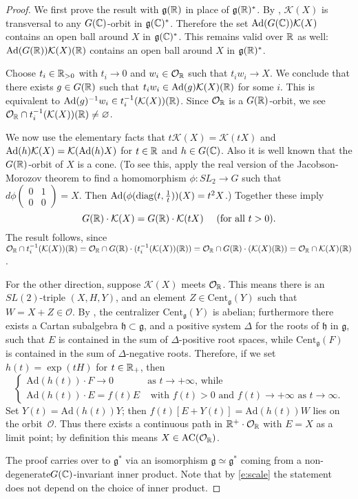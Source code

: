 \documentclass{article}
\theoremstyle{definition}
\numberwithin{equation}{section}
\renewcommand{\-}{\hyp{}}
\newcommand{\g}{\mathfrak g}
\renewcommand{\O}{\mathcal O}
\newcommand{\K}{\mathcal K}
\newcommand{\Cent}{\mathrm{Cent}}
\newcommand{\AC}{\mathrm{AC}}
\begin{document}
\begin{proof}
We first prove the result with $\g(\R)$  in place of $\g(\R)^*$.
By \cite{Kos63}, $\K(X)$ is transversal to any $G(\mathbb{C})$-orbit in $\g(\C)^*$. Therefore the set $\tx{Ad}(G(\C))\K(X)$ contains an open ball around $X$ in $\g(\C)^*$.
This remains valid over $\mathbb{R}$ as well: $\tx{Ad}(G(\R))\K(X)(\R)$ contains an open ball around $X$ in $\g(\R)^*$.

Choose $t_i \in \mathbb{R}_{>0}$ with $t_i \to 0$ and $w_i \in \O_\R$ such that $t_iw_i \to X$. We conclude that there exists $g \in G(\mathbb{R})$ such that $t_iw_i \in \tx{Ad}(g)\K(X)(\R)$ for some $i$. This is equivalent to $\tx{Ad}(g)^{-1}w_i \in t_i^{-1}(\K(X))(\R)$. Since $\O_\R$ is a $G(\mathbb{R})$-orbit, we see $\O_\R \cap t_i^{-1}(\K(X))(\R) \neq \varnothing$. 

We now use the elementary facts that $t\K(X)=\K(tX)$ and $\tx{Ad}(h)\K(X)=\K(\tx{Ad}(h)X)$ for $t \in \mathbb{R}$ and $h \in G(\mathbb{C})$.
Also it is well known that the $G(\mathbb{R})$-orbit of $X$ is a cone. (To see this, apply the real version of the Jacobson-Morozov theorem
\cite[Theorem 9.2.1]{CM} to  find a homomorphism $\phi:SL_2\rightarrow G$ such that $d\phi\begin{pmatrix}0&1\\0&0\end{pmatrix}=X$.
Then $\textrm{Ad}(\phi(\mathrm{diag}(t,\frac 1t))(X)=t^2X$.)
Together these imply
\begin{equation}
\label{e:scale}
G(\R)\cdot \K(X)=G(\R)\cdot \K(tX) \quad \text{ (for all $t>0$).}
\end{equation}
The result follows, since
$\O_\R \cap t_i^{-1}(\K(X))(\R)=\O_\R \cap G(\R)\cdot(t_i^{-1}(\K(X))(\R))=
\O_\R \cap G(\R)\cdot(\K(X)(\R))=\O_\R\cap \K(X)(\R)$.

For the other direction, suppose $\K(X)$ meets $\mathcal O_{\mathbb{R}}$.
This means there is an $SL(2)$-triple $(X,H,Y)$, and an element $Z\in \Cent_\g(Y)$ such that $W=X+Z \in \O$. 
By \cite{Kostant59}, the centralizer  $\mathrm{Cent}_{\g}(Y)$ is abelian; furthermore there exists a Cartan subalgebra $\mathfrak{h} \subset \g$, and a positive system $\Delta$ for the roots of $\mathfrak{h}$ in $\g$, such that $E$ is contained in the sum of $\Delta$-positive root spaces, while $\mathrm{Cent}_{\g}(F)$ is contained in the sum of $\Delta$-negative roots.  Therefore, if we set $h(t) = \exp(tH)$ for $t \in \mathbb{R}_+$, then 
\[\begin{cases} \mathrm{Ad}(h(t)) \cdot F \longrightarrow 0 & \text{as $t \to +\infty$, while} \\
 \mathrm{Ad}(h(t)) \cdot E = f(t) E & \text{ with $f(t) >0$ and $f(t)\to +\infty$ as $t \to \infty$.}\end{cases}\]
Set $Y(t) = \mathrm{Ad}(h(t)) Y$; then $f(t) \left[ E + Y(t) \right] = \mathrm{Ad}(h(t)) W$ lies on the orbit~$\O$. Thus there exists a continuous path in $\R^+ \cdot \O_\R$ with $E=X$ as a limit point; by definition this means $X \in \AC(\O_\R)$.

The proof carries over to $\g^*$ via an isomorphism $\g\simeq \g^*$ coming from a non-degenerate$G(\mathbb{C})$-invariant inner product. 
Note that by \eqref{e:scale} the statement does not depend on the choice of inner product.
\end{proof}
\end{document}
